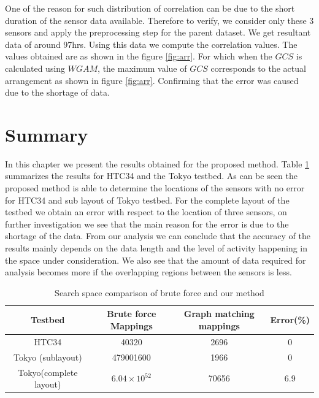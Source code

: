 One of the reason for such distribution of correlation can be due to the short duration of the sensor data available. Therefore to verify, we consider only these 3 sensors and apply the preprocessing step for the parent dataset. We get resultant data of around 97hrs. Using this data we compute the correlation values. The values obtained are as shown in the figure \ref{fig:arr}. For which when the $GCS$ is calculated using $WGAM$, the maximum value of $GCS$ corresponds to the actual arrangement as shown in figure \ref{fig:arr}. Confirming that the error was caused due to the shortage of data.


\section{Summary}

In this chapter we present the results obtained for the proposed method. Table \ref{tab:resSummary} summarizes the results for HTC34 and the Tokyo testbed. As can be seen the proposed method is able to determine the locations of the sensors with no error for HTC34 and sub layout of Tokyo testbed. For the complete layout of the testbed we obtain an error with respect to the location of three sensors, on further investigation we see that the main reason for the error is due to the shortage of the data. From our analysis we can conclude that the accuracy of the results mainly depends on the data length and the level of activity happening in the space under consideration. We also see that the amount of data required for analysis becomes more if the overlapping regions between the sensors is less.

\begin{table}[]
\centering
\caption{Search space comparison of brute force and our method}
\label{tab:resSummary}
\begin{tabular}{|c|c|c|c|}
\hline
Testbed                & Brute force Mappings  & Graph matching mappings & Error(\%) \\ \hline
HTC34                  & 40320                 & 2696                    & 0         \\ \hline
Tokyo (sublayout)      & 479001600             & 1966                     & 0         \\ \hline
Tokyo(complete layout) & $6.04 \times 10^{52}$ & 70656                  & 6.9       \\ \hline
\end{tabular}
\end{table}


















